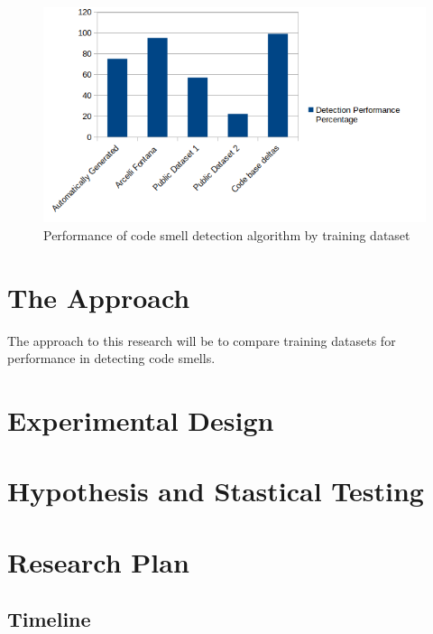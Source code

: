 \documentclass[conference]{IEEEtran}
\begin{document}
\begin{figure}[ht]
  \centerline{\includegraphics[width=\linewidth]{teaser.png}}
  \caption{Performance of code smell detection algorithm by training dataset}
  \label{fig:ts}
\end{figure} 

\section{The Approach}
The approach to this research will be to compare training datasets for performance in detecting code smells.

\section{Experimental Design}

\section{Hypothesis and Stastical Testing}

\section{Research Plan}

\subsection{Timeline}

\clearpage




\end{document}
